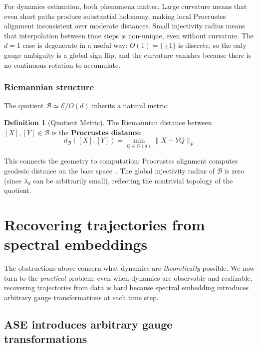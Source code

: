 \documentclass{article}
\theoremstyle{plain}
\theoremstyle{definition}
\newtheorem{definition}{Definition}
\theoremstyle{remark}
\begin{document}
For dynamics estimation, both phenomena matter.
Large curvature means that even short paths produce substantial holonomy, making local Procrustes alignment inconsistent over moderate distances.
Small injectivity radius means that interpolation between time steps is non-unique, even without curvature.
The $d = 1$ case is degenerate in a useful way: $O(1) = \{\pm 1\}$ is discrete, so the only gauge ambiguity is a global sign flip, and the curvature vanishes because there is no continuous rotation to accumulate.

\subsubsection{Riemannian structure}

The quotient $\mathcal{B} \simeq \mathcal{E} / O(d)$ inherits a natural metric:

\begin{definition}[Quotient Metric]
The Riemannian distance between $[X], [Y] \in \mathcal{B}$ is the \textbf{Procrustes distance}:
\begin{equation}
d_{\mathcal{B}}([X], [Y]) = \min_{Q \in O(d)} \|X - YQ\|_F
\end{equation}
\end{definition}

This connects the geometry to computation: Procrustes alignment computes geodesic distance on the base space~\citep{massart2020quotient}.
The global injectivity radius of $\mathcal{B}$ is zero (since $\lambda_d$ can be arbitrarily small), reflecting the nontrivial topology of the quotient.




\section{Recovering trajectories from spectral embeddings}\label{sec:trajectory-problem}

The obstructions above concern what dynamics are \emph{theoretically} possible.
We now turn to the \emph{practical} problem: even when dynamics are observable and realizable, recovering trajectories from data is hard because spectral embedding introduces arbitrary gauge transformations at each time step.

\subsection{ASE introduces arbitrary gauge transformations}
\end{document}
